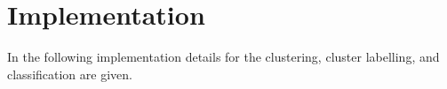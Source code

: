 
\section{Implementation}
\label{sec:implementation}
In the following implementation details for the clustering, cluster labelling, and classification are given.




